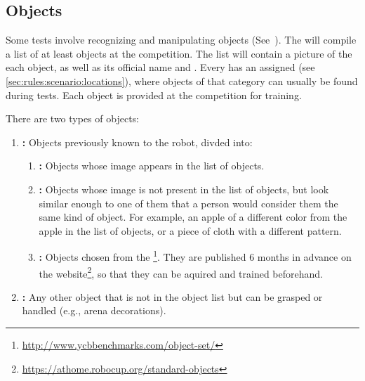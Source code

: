 \subsection{Objects}
\label{sec:rules:scenario:objects}
Some tests involve recognizing and manipulating objects (See~).
The \TC{} will compile a list of at least \NumObjects{} objects at the competition. The list will contain a picture of the each object, as well as its official name and \ObjectCategory{}. Every \ObjectCategory{} has an assigned \PredefinedLocation{} (see \ref{sec:rules:scenario:locations}), where objects of that category can usually be found during tests.
Each object is provided at the competition for training.

There are two types of objects:

\begin{enumerate}
	\item \textbf{\KnownObjects{}:} Objects previously known to the robot, divded into:
	\begin{enumerate}
		\item \textbf{\ConsistentObjects{}:} Objects whose image appears in the list of objects.
		\item \textbf{\SimilarObjects{}:} Objects whose image is not present in the list of objects, but look similar enough to one of them that a person would consider them the same kind of object. For example, an apple of a different color from the apple in the list of objects, or a piece of cloth with a different pattern.
		\item \textbf{\StandardObjects{}:} Objects chosen from the \YCBData{}\footnote{\url{http://www.ycbbenchmarks.com/object-set/}}. They are published 6 months in advance on the \RoboCup\AtHome{} website\footnote{\url{https://athome.robocup.org/standard-objects}}, so that they can be aquired and trained beforehand.
	\end{enumerate}

	\item \textbf{\UnknownObjects{}:} Any other object that is not in the object list but can be grasped or handled (e.g., arena decorations).
\end{enumerate}

